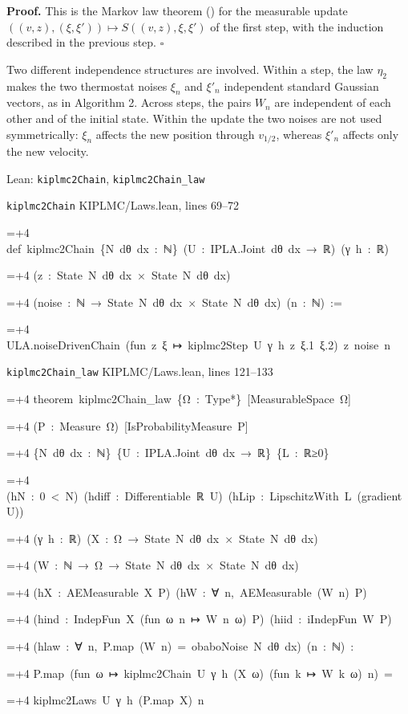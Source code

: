 \documentclass[11pt,a4paper]{report}
\newlength{\leancharwidth}
\newenvironment{leancode}{\par\smallskip\begingroup\ttfamily\footnotesize\raggedright
  \settowidth{\leancharwidth}{M}\setlength{\parskip}{0pt}\setlength{\parindent}{0pt}
  \frenchspacing}{\par\endgroup\smallskip}
\newcommand{\leanline}[2]{\hangindent=\dimexpr#1\leancharwidth+4\leancharwidth\relax
  \hangafter=1\noindent\hspace*{#1\leancharwidth}#2\par}
\newcommand{\leansource}[1]{\par{\footnotesize\color{leanmuted}#1}\par}
\begin{document}
\textbf{Proof.} This is the Markov law theorem (\cite[Section~3.33.12]{LangevinLean2026ULASC}) for the measurable update \(((v,z),(\xi,\xi'))\mapsto S((v,z),\xi,\xi')\) of the first step, with the induction described in the previous step. \(\square\)




Two different independence structures are involved. Within a step, the law \(\eta_2\) makes the two thermostat noises \(\xi_n\) and \(\xi'_n\) independent standard Gaussian vectors, as in Algorithm 2. Across steps, the pairs \(W_n\) are independent of each other and of the initial state. Within the update the two noises are not used symmetrically: \(\xi_n\) affects the new position through \(v_{1/2}\), whereas \(\xi'_n\) affects only the new velocity.

\begin{leanbox}{Lean: \texttt{kiplmc2Chain}, \texttt{kiplmc2Chain\_\allowbreak{}law}}
\leansource{\texttt{kiplmc2Chain} \quad KIPLMC/\allowbreak{}Laws.lean, lines 69–72}
\begin{leancode}
\leanline{0}{def\ kiplmc2Chain\ \{N\ dθ\ dx\ :\ ℕ\}\ (U\ :\ IPLA.Joint\ dθ\ dx\ →\ ℝ)\ (γ\ h\ :\ ℝ)}
\leanline{4}{(z\ :\ State\ N\ dθ\ dx\ ×\ State\ N\ dθ\ dx)}
\leanline{4}{(noise\ :\ ℕ\ →\ State\ N\ dθ\ dx\ ×\ State\ N\ dθ\ dx)\ (n\ :\ ℕ)\ :=}
\leanline{2}{ULA.noiseDrivenChain\ (fun\ z\ ξ\ ↦\ kiplmc2Step\ U\ γ\ h\ z\ ξ.1\ ξ.2)\ z\ noise\ n}
\end{leancode}
\leansource{\texttt{kiplmc2Chain\_\allowbreak{}law} \quad KIPLMC/\allowbreak{}Laws.lean, lines 121–133}
\begin{leancode}
\leanline{0}{theorem\ kiplmc2Chain\_law\ \{Ω\ :\ Type*\}\ [MeasurableSpace\ Ω]}
\leanline{4}{(P\ :\ Measure\ Ω)\ [IsProbabilityMeasure\ P]}
\leanline{4}{\{N\ dθ\ dx\ :\ ℕ\}\ \{U\ :\ IPLA.Joint\ dθ\ dx\ →\ ℝ\}\ \{L\ :\ ℝ≥0\}}
\leanline{4}{(hN\ :\ 0\ <\ N)\ (hdiff\ :\ Differentiable\ ℝ\ U)\ (hLip\ :\ LipschitzWith\ L\ (gradient\ U))}
\leanline{4}{(γ\ h\ :\ ℝ)\ (X\ :\ Ω\ →\ State\ N\ dθ\ dx\ ×\ State\ N\ dθ\ dx)}
\leanline{4}{(W\ :\ ℕ\ →\ Ω\ →\ State\ N\ dθ\ dx\ ×\ State\ N\ dθ\ dx)}
\leanline{4}{(hX\ :\ AEMeasurable\ X\ P)\ (hW\ :\ ∀\ n,\ AEMeasurable\ (W\ n)\ P)}
\leanline{4}{(hind\ :\ IndepFun\ X\ (fun\ ω\ n\ ↦\ W\ n\ ω)\ P)\ (hiid\ :\ iIndepFun\ W\ P)}
\leanline{4}{(hlaw\ :\ ∀\ n,\ P.map\ (W\ n)\ =\ obaboNoise\ N\ dθ\ dx)\ (n\ :\ ℕ)\ :}
\leanline{4}{P.map\ (fun\ ω\ ↦\ kiplmc2Chain\ U\ γ\ h\ (X\ ω)\ (fun\ k\ ↦\ W\ k\ ω)\ n)\ =}
\leanline{6}{kiplmc2Laws\ U\ γ\ h\ (P.map\ X)\ n}
\end{leancode}

\end{leanbox}
\end{document}
